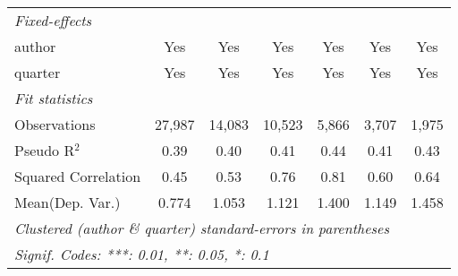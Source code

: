 \begin{tabular}{lcccccc}
   \midrule
   \emph{Fixed-effects}\\
   author                                                     & Yes            & Yes            & Yes            & Yes            & Yes            & Yes\\  
   quarter                                                    & Yes            & Yes            & Yes            & Yes            & Yes            & Yes\\  
   \midrule
   \emph{Fit statistics}\\
   Observations                                               & 27,987         & 14,083         & 10,523         & 5,866          & 3,707          & 1,975\\  
   Pseudo R$^2$                                               & 0.39           & 0.40           & 0.41           & 0.44           & 0.41           & 0.43\\  
   Squared Correlation                                        & 0.45           & 0.53           & 0.76           & 0.81           & 0.60           & 0.64\\  
Mean(Dep. Var.) & 0.774 & 1.053 & 1.121 & 1.400 & 1.149 & 1.458 \\
   \midrule \midrule
   \multicolumn{7}{l}{\emph{Clustered (author \& quarter) standard-errors in parentheses}}\\
   \multicolumn{7}{l}{\emph{Signif. Codes: ***: 0.01, **: 0.05, *: 0.1}}\\
\end{tabular}
\par\endgroup
